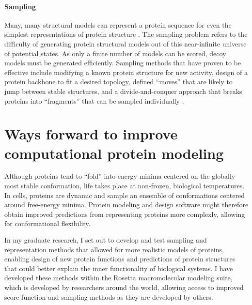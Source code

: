 \paragraph{Sampling}
Many, many structural models can represent a protein sequence for even the simplest representations of protein structure \cite{levinthal_how_1969,karplus_levinthal_1997}.
The sampling problem refers to the difficulty of generating protein structural models out of this near-infinite universe of potential states.
As only a finite number of models can be scored, decoy models must be generated efficiently.
Sampling methods that have proven to be effective include modifying a known protein structure for new activity\cite{jiang_novo_2008,siegel_computational_2010}, design of a protein backbone to fit a desired topology\cite{kuhlman_design_2003}, defined ``moves'' that are likely to jump between stable structures\cite{davis_backrub_2006,mandell_sub-angstrom_2009,friedland_simple_2008}, and a divide-and-conquer approach that breaks proteins into ``fragments'' that can be sampled individually \cite{simons_assembly_1997}.

\section{Ways forward to improve computational protein modeling}
Although proteins tend to ``fold'' into energy minima centered on the globally most stable conformation\cite{dill_levinthal_1997}, life takes place at non-frozen, biological temperatures.
In cells, proteins are dynamic and sample an ensemble of conformations centered around free-energy minima\cite{henzler-wildman_dynamic_2007}.
Protein modeling and design software might therefore obtain improved predictions from representing proteins more complexly, allowing for conformational flexibility.

In my graduate research, I set out to develop and test sampling and representation methods that allowed for more realistic models of proteins, enabling design of new protein functions and predictions of protein structures that could better explain the inner functionality of biological systems.
I have developed these methods within the Rosetta macromolecular modeling suite, which is developed by researchers around the world, allowing access to improved score function and sampling methods as they are developed by others.


